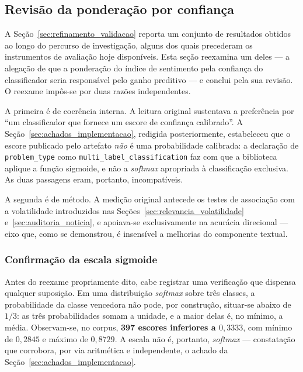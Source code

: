 \subsection{Revisão da ponderação por confiança}
\label{sec:revisao_ponderacao}

A Seção~\ref{sec:refinamento_validacao} reporta um conjunto de resultados obtidos ao longo do
percurso de investigação, alguns dos quais precederam os instrumentos de avaliação hoje disponíveis.
Esta seção reexamina um deles --- a alegação de que a ponderação do índice de sentimento pela
confiança do classificador seria responsável pelo ganho preditivo --- e conclui pela sua revisão. O
reexame impôs-se por duas razões independentes.

A primeira é de coerência interna. A leitura original sustentava a preferência por
``um classificador que fornece um escore de confiança calibrado''. A
Seção~\ref{sec:achados_implementacao}, redigida posteriormente, estabeleceu que o escore publicado
pelo artefato \emph{não} é uma probabilidade calibrada: a declaração de
\texttt{problem\_type} como \texttt{multi\_label\_classification} faz com que a
biblioteca aplique a função sigmoide, e não a \textit{softmax} apropriada à classificação
exclusiva. As duas passagens eram, portanto, incompatíveis.

A segunda é de método. A medição original antecede os testes de associação com a volatilidade
introduzidos nas Seções~\ref{sec:relevancia_volatilidade} e~\ref{sec:auditoria_noticia}, e apoiava-se
exclusivamente na acurácia direcional --- eixo que, como se demonstrou, é insensível a melhorias do
componente textual.

\subsubsection{Confirmação da escala sigmoide}

Antes do reexame propriamente dito, cabe registrar uma verificação que dispensa qualquer suposição.
Em uma distribuição \textit{softmax} sobre três classes, a probabilidade da classe vencedora não
pode, por construção, situar-se abaixo de $1/3$: as três probabilidades somam a unidade, e a maior
delas é, no mínimo, a média. Observam-se, no corpus, \textbf{397 escores inferiores a $0{,}3333$},
com mínimo de $0{,}2845$ e máximo de $0{,}8729$. A escala não é, portanto,
\textit{softmax} --- constatação que corrobora, por via aritmética e independente, o achado da
Seção~\ref{sec:achados_implementacao}.

